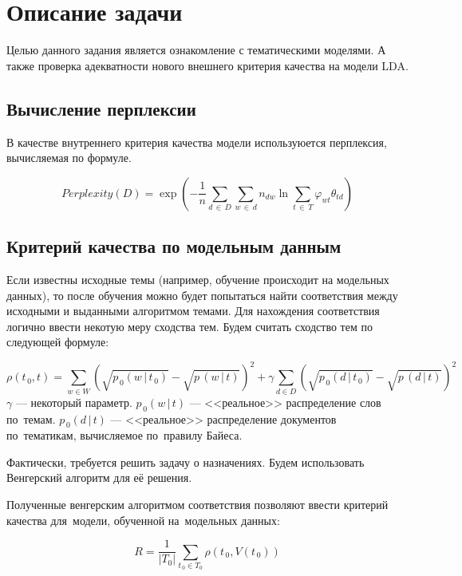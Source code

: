 \documentclass[12pt]{article}
\begin{document}
\section{Описание задачи}

Целью данного задания является ознакомление с тематическими моделями.
А также проверка адекватности нового внешнего критерия качества на модели LDA.

\subsection{Вычисление перплексии}

В качестве внутреннего критерия качества модели используюется перплексия, вычисляемая по формуле.

\[
  Perplexity(D) = 
    \exp\left(
      -\frac1{n}\sum_{d\,\in\,D} \sum_{w\,\in\,d} n_{dw} \ln\sum_{t\,\in\,T} \varphi_{wt} \theta_{td}
    \right)
\]

\subsection{Критерий качества по модельным данным}

Если известны исходные темы (например, обучение происходит на модельных данных), то после обучения можно будет попытаться найти соответствия между исходными и выданными алгоритмом темами.
Для нахождения соответствия логично ввести некотую меру сходства тем.
Будем считать сходство тем по следующей формуле:

\[
  \rho(t_{\,0},t) = 
    \sum_{w\in W}\left(
      \sqrt{p_{\,0}(w\,|\,t_{\,0})} - \sqrt{p\,(w\,|\,t)}
    \right)^2 + 
    \gamma\!\sum_{d\in D}\left(
      \sqrt{p_{\,0}(d\,|\,t_{\,0})} - \sqrt{p\,(d\,|\,t)}
    \right)^2
\]
$\displaystyle \gamma $ --- некоторый параметр. \newline
$\displaystyle p_{\,0}(w\,|\,t) $ --- <<реальное>> распределение слов по~темам. \newline
$\displaystyle p_{\,0}(d\,|\,t) $ --- <<реальное>> распределение документов по~тематикам, вычисляемое по~правилу Байеса.

Фактически, требуется решить задачу о назначениях.
Будем использовать Венгерский алгоритм для её решения.

Полученные венгерским алгоритмом соответствия позволяют ввести критерий качества для~модели, обученной на~модельных данных:

\[
R = \frac1{|T_0|} \sum_{t_{\,0}\in T_0} \rho(t_{\,0},V(t_{\,0}))
\]
\end{document}
